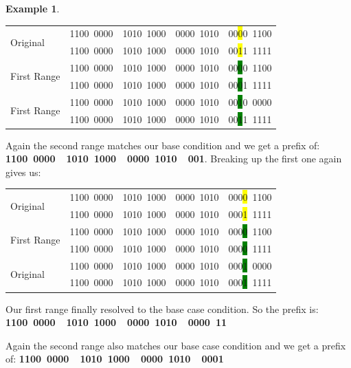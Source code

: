 \documentclass[pdf,bookmarks,colorlinks=true]{article}
\theoremstyle{definition}
\newtheorem{example}{Example}[section]
\begin{document}
\begin{example}
\begin{center}
	\begin{tabular}{|l|l|}\hline
		\multirow{2}{*}{Original} & 1100~0000~~1010~1000~~0000~1010~~00\colorbox{yellow}{0}0~1100 \\
		& 1100~0000~~1010~1000~~0000~1010~~00\colorbox{yellow}{1}1~1111 \\ \hline
		\multirow{2}{*}{First Range} & 1100~0000~~1010~1000~~0000~1010~~00\colorbox{green}{0}0~1100 \\
		& 1100~0000~~1010~1000~~0000~1010~~00\colorbox{green}{0}1~1111 \\ \hline
		\multirow{2}{*}{First Range} & 1100~0000~~1010~1000~~0000~1010~~00\colorbox{green}{1}0~0000 \\
		& 1100~0000~~1010~1000~~0000~1010~~00\colorbox{green}{1}1~1111 \\ \hline
	\end{tabular}
\end{center}

Again the second range matches our base condition and we get a prefix of: \textbf{1100~0000~~1010~1000~~0000~1010~~001}. Breaking up the first one again gives us:\bigskip

\begin{center}
	\begin{tabular}{|l|l|}\hline
		\multirow{2}{*}{Original} & 1100~0000~~1010~1000~~0000~1010~~000\colorbox{yellow}{0}~1100 \\
		& 1100~0000~~1010~1000~~0000~1010~~000\colorbox{yellow}{1}~1111 \\ \hline
		\multirow{2}{*}{First Range} & 1100~0000~~1010~1000~~0000~1010~~000\colorbox{green}{0}~1100 \\
		& 1100~0000~~1010~1000~~0000~1010~~000\colorbox{green}{0}~1111 \\ \hline
		\multirow{2}{*}{Original} & 1100~0000~~1010~1000~~0000~1010~~000\colorbox{green}{1}~0000 \\
		& 1100~0000~~1010~1000~~0000~1010~~000\colorbox{green}{1}~1111 \\ \hline
	\end{tabular}
\end{center}

Our first range finally resolved to the base case condition. So the prefix is: \textbf{1100~0000~~1010~1000~~0000~1010~~0000~11}

Again the second range also matches our base case condition and we get a prefix of: \textbf{1100~0000~~1010~1000~~0000~1010~~0001}


\end{example}
\end{document}
